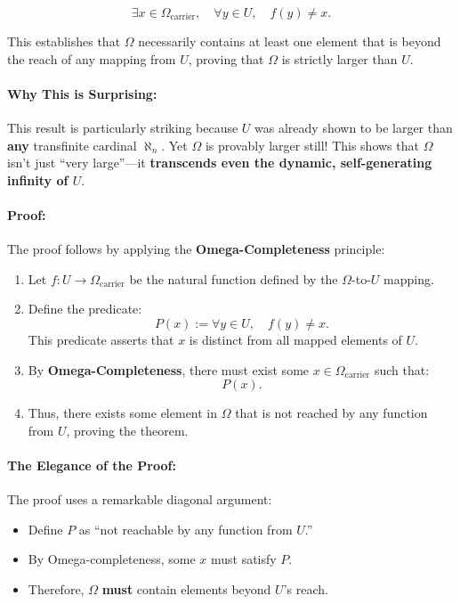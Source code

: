 \documentclass[12pt]{article}
\begin{document}
\begin{equation}
    \exists x \in \Omega_{\text{carrier}}, \quad
    \forall y \in U, \quad f(y) \neq x.
\end{equation}

This establishes that \( \Omega \) necessarily contains at least one element that is beyond the reach of any mapping from \( U \), proving that \( \Omega \) is strictly larger than \( U \).

\paragraph{Why This is Surprising:}
This result is particularly striking because \( U \) was already shown to be larger than \textbf{any} transfinite cardinal \( \aleph_n \). Yet \( \Omega \) is provably larger still! This shows that \( \Omega \) isn’t just “very large”—it \textbf{transcends even the dynamic, self-generating infinity of \( U \)}.

\paragraph{Proof:}
The proof follows by applying the \textbf{Omega-Completeness} principle:

\begin{enumerate}
    \item Let \( f: U \to \Omega_{\text{carrier}} \) be the natural function defined by the \( \Omega \)-to-\( U \) mapping.
    \item Define the predicate:
    \[
    P(x) := \forall y \in U, \quad f(y) \neq x.
    \]
    This predicate asserts that \( x \) is distinct from all mapped elements of \( U \).
    \item By \textbf{Omega-Completeness}, there must exist some \( x \in \Omega_{\text{carrier}} \) such that:
    \[
    P(x).
    \]
    \item Thus, there exists some element in \( \Omega \) that is not reached by any function from \( U \), proving the theorem.
\end{enumerate}

\paragraph{The Elegance of the Proof:}
The proof uses a remarkable diagonal argument:
\begin{itemize}
    \item Define \( P \) as “not reachable by any function from \( U \).”
    \item By Omega-completeness, some \( x \) must satisfy \( P \).
    \item Therefore, \( \Omega \) \textbf{must} contain elements beyond \( U \)’s reach.
\end{itemize}
\end{document}

